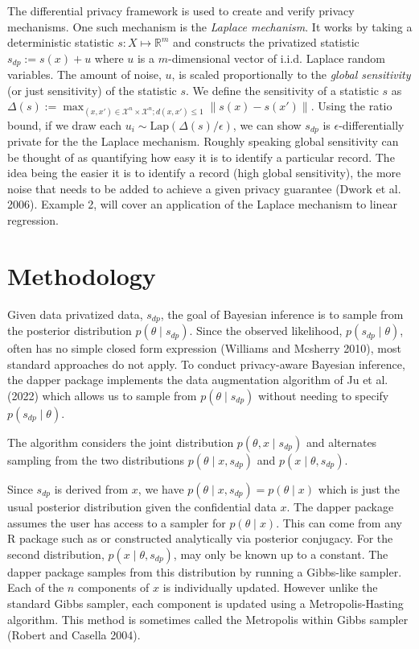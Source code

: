 The differential privacy framework is used to create and verify privacy
mechanisms. One such mechanism is the \emph{Laplace mechanism}. It works by
taking a deterministic statistic \(s: X \mapsto \mathbb{R}^m\) and constructs
the privatized statistic \(s_{dp} := s(x) + u\) where \(u\) is a \(m\)-dimensional
vector of i.i.d. Laplace random variables. The amount of noise, \(u\), is scaled
proportionally to the \emph{global sensitivity} (or just sensitivity) of the statistic \(s\).
We define the sensitivity of a statistic \(s\) as
\(\Delta (s) := \max_{(x,x') \in \mathcal{X}^n \times \mathcal{X}^n; d(x,x') \leq 1} \|s(x) - s(x')\|\).
Using the ratio bound, if we draw
each \(u_i \sim \text{Lap}(\Delta (s) / \epsilon)\), we can show \(s_{dp}\) is \(\epsilon\)-differentially private
for the the Laplace mechanism. Roughly speaking
global sensitivity can be thought of as quantifying how easy it is to identify
a particular record. The idea being the easier it is to identify a record (high global sensitivity),
the more noise that needs to be added to achieve a given privacy guarantee (Dwork et al. 2006). Example 2, will cover an
application of the Laplace mechanism to linear regression.

\hypertarget{methodology}{%
\section{Methodology}\label{methodology}}

Given data privatized data, \(s_{dp}\), the goal of Bayesian inference is to sample from the
posterior distribution \(p(\theta \mid s_{dp})\). Since the observed likelihood,
\(p(s_{dp} \mid \theta)\), often has no simple closed form expression (Williams and Mcsherry 2010), most standard approaches
do not apply. To conduct privacy-aware Bayesian inference, the dapper package implements
the data augmentation algorithm of Ju et al. (2022) which allows us to sample from \(p(\theta \mid s_{dp})\)
without needing to specify \(p(s_{dp} \mid \theta)\).

The algorithm considers the joint distribution \(p(\theta, x \mid s_{dp})\) and
alternates sampling from the two distributions \(p(\theta \mid x, s_{dp})\)
and \(p(x \mid \theta, s_{dp})\).

Since \(s_{dp}\) is derived from \(x\), we have \(p(\theta \mid x, s_{dp}) = p(\theta \mid x)\) which
is just the usual posterior distribution given the confidential data \(x\). The dapper
package assumes the user has access to a sampler for \(p(\theta \mid x)\). This can
come from any R package such as  or constructed analytically via posterior conjugacy.
For the second distribution, \(p(x \mid \theta, s_{dp})\), may
only be known up to a constant. The dapper package samples from this distribution by
running a Gibbs-like sampler. Each of the \(n\) components of \(x\) is individually
updated. However unlike the standard Gibbs sampler, each component is updated
using a Metropolis-Hasting algorithm. This method is sometimes called the Metropolis within Gibbs sampler (Robert and Casella 2004).

